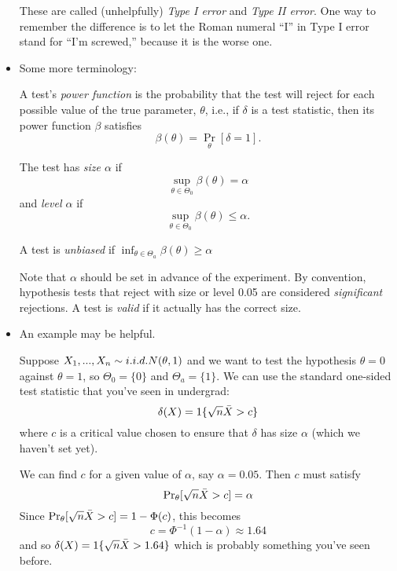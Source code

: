 \begin{itemize}
  These are called (unhelpfully) \emph{Type I error} and \emph{Type II
  error}.  One way to remember the difference is to let the Roman
  numeral ``I'' in Type I error stand for ``I'm screwed,'' because it
  is the worse one.

\item Some more terminology:
  \begin{defn}
    A test's \emph{power function} is the probability that the test
    will reject for each possible value of the true parameter, $\theta$,
    i.e., if $\delta$ is a test statistic, then its power function $\beta$
    satisfies
    \begin{equation*}
      \beta(\theta) = \Pr_\theta[\delta = 1].
    \end{equation*}
    
    The test has \emph{size $\alpha$} if
    \begin{equation*}
      \sup_{\theta \in \Theta_0} \beta(\theta) = \alpha
    \end{equation*}
    and \emph{level $\alpha$} if
    \begin{equation*}
      \sup_{\theta \in \Theta_0} \beta(\theta) \leq \alpha.
    \end{equation*}

    A test is \emph{unbiased} if $\inf_{\theta \in \Theta_a} \beta(\theta) \geq \alpha$
  \end{defn}

  Note that $\alpha$ should be set in advance of the experiment.  By
  convention, hypothesis tests that reject with size or level 0.05 are
  considered \emph{significant} rejections.  A test is \emph{valid} if
  it actually has the correct size.

\item An example may be helpful.
  \begin{ex}
    Suppose $X_1,...,X_n \sim i.i.d. N(\theta,1)$ and we want to test the
    hypothesis $\theta = 0$ against $\theta = 1$, so $\Theta_0 = \{0\}$ and $\Theta_a =
    \{1\}$.  We can use the  standard one-sided test statistic that
    you've seen in undergrad:
    \begin{equation*}
      \delta(X) = \operatorname{1}\{\sqrt{n} \bar{X} > c\}
    \end{equation*}
    where $c$ is a critical value chosen to ensure that $\delta$ has size
    $\alpha$ (which we haven't set yet).

    We can find $c$ for a given value of $\alpha$, say $\alpha = 0.05$.  Then
    $c$ must satisfy
    \begin{equation*}
      \operatorname{Pr}_\theta[\sqrt{n} \bar{X} > c] = \alpha
    \end{equation*}
    Since $\operatorname{Pr}_\theta[\sqrt{n} \bar{X} > c] = 1 - \Phi(c)$, this becomes
    \begin{equation*}
      c = \Phi^{-1}(1 - \alpha) \approx 1.64
    \end{equation*}
    and so $\delta(X) = \operatorname{1}\{\sqrt{n} \bar{X} > 1.64\}$ which is probably
    something you've seen before.


\end{ex}
\end{itemize}
